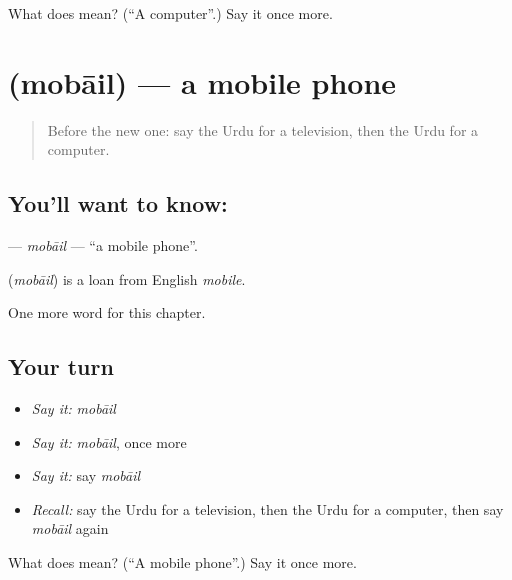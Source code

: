 \begin{tcolorbox}[breakable,colback=teal!4,colframe=teal!35!black,title={Before you move on}]
What does  mean? (\textquotedblleft{}A computer\textquotedblright{}.) Say it once more.
\end{tcolorbox}
\section[\texorpdfstring{\ur{موبائل} (mobāil)}{موبائل (mobāil)}]{ (mobāil) — a mobile phone}

\label{lesson:UR-C110-mobail}



\begin{quote}
Before the new one: say the Urdu for a television, then the Urdu for a computer.
\end{quote}

\subsection*{You'll want to know: }
\textbf{} — \emph{mobāil} — \textquotedblleft{}a mobile phone\textquotedblright{}.

\begin{cousinweb}
\textbf{} (\emph{mobāil}) is a loan from English \emph{mobile}.
\end{cousinweb}

\begin{grammarlens}[title={What you've built}]
One more word for this chapter.
\end{grammarlens}

\subsection*{Your turn}
\begin{itemize}
\raggedright
  \item \emph{Say it:} \emph{mobāil}
  \item \emph{Say it:} \emph{mobāil}, once more
  \item \emph{Say it:} say \emph{mobāil}
  \item \emph{Recall:} say the Urdu for a television, then the Urdu for a computer, then say \emph{mobāil} again
\end{itemize}

\begin{tcolorbox}[breakable,colback=teal!4,colframe=teal!35!black,title={Before you move on}]
What does  mean? (\textquotedblleft{}A mobile phone\textquotedblright{}.) Say it once more.
\end{tcolorbox}
